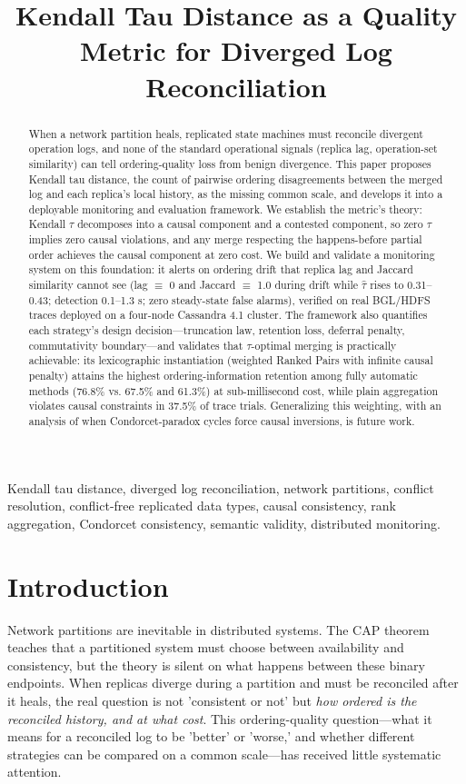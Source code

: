 \documentclass[journal]{IEEEtran}
\title{Kendall Tau Distance as a Quality Metric for Diverged Log Reconciliation}
\author{}
\date{}
\begin{document}
\maketitle

\begin{abstract}
When a network partition heals, replicated state machines must reconcile divergent operation logs, and none of the standard operational signals (replica lag, operation-set similarity) can tell ordering-quality loss from benign divergence. This paper proposes Kendall tau distance, the count of pairwise ordering disagreements between the merged log and each replica's local history, as the missing common scale, and develops it into a deployable monitoring and evaluation framework. We establish the metric's theory: Kendall $\tau$ decomposes into a causal component and a contested component, so zero $\tau$ implies zero causal violations, and any merge respecting the happens-before partial order achieves the causal component at zero cost. We build and validate a monitoring system on this foundation: it alerts on ordering drift that replica lag and Jaccard similarity cannot see (lag $\equiv$ 0 and Jaccard $\equiv$ 1.0 during drift while $\hat{\tau}$ rises to 0.31–0.43; detection 0.1–1.3 s; zero steady-state false alarms), verified on real BGL/HDFS traces deployed on a four-node Cassandra 4.1 cluster. The framework also quantifies each strategy's design decision—truncation law, retention loss, deferral penalty, commutativity boundary—and validates that $\tau$-optimal merging is practically achievable: its lexicographic instantiation (weighted Ranked Pairs with infinite causal penalty) attains the highest ordering-information retention among fully automatic methods (76.8\% vs. 67.5\% and 61.3\%) at sub-millisecond cost, while plain aggregation violates causal constraints in 37.5\% of trace trials. Generalizing this weighting, with an analysis of when Condorcet-paradox cycles force causal inversions, is future work.
\end{abstract}
\begin{IEEEkeywords}
Kendall tau distance, diverged log reconciliation, network partitions, conflict resolution, conflict-free replicated data types, causal consistency, rank aggregation, Condorcet consistency, semantic validity, distributed monitoring.
\end{IEEEkeywords}



\section{Introduction}
Network partitions are inevitable in distributed systems. The CAP theorem teaches that a partitioned system must choose between availability and consistency, but the theory is silent on what happens between these binary endpoints. When replicas diverge during a partition and must be reconciled after it heals, the real question is not 'consistent or not' but \emph{how ordered is the reconciled history, and at what cost}. This ordering-quality question—what it means for a reconciled log to be 'better' or 'worse,' and whether different strategies can be compared on a common scale—has received little systematic attention.
\end{document}
